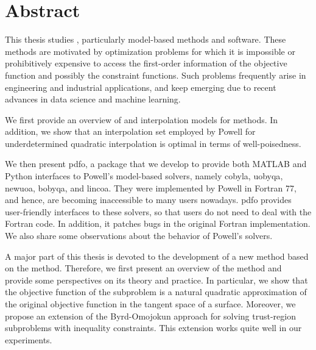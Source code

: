 %
%
%
\chapter*{Abstract}
\label{ch:abstract}

This thesis studies , particularly model-based methods and software.
These methods are motivated by optimization problems for which it is impossible or prohibitively expensive to access the first-order information of the objective function and possibly the constraint functions.
Such problems frequently arise in engineering and industrial applications, and keep emerging due to recent advances in data science and machine learning.

We first provide an overview of  and interpolation models for  methods.
In addition, we show that an interpolation set employed by Powell for underdetermined quadratic interpolation is optimal in terms of well-poisedness.

We then present \gls{pdfo}, a package that we develop to provide both MATLAB and Python interfaces to Powell's model-based  solvers, namely \gls{cobyla}, \gls{uobyqa}, \gls{newuoa}, \gls{bobyqa}, and \gls{lincoa}.
They were implemented by Powell in Fortran 77, and hence, are becoming inaccessible to many users nowadays.
\Gls{pdfo} provides user-friendly interfaces to these solvers, so that users do not need to deal with the Fortran code.
In addition, it patches bugs in the original Fortran implementation.
We also share some observations about the behavior of Powell's solvers.

A major part of this thesis is devoted to the development of a new  method based on the  method.
Therefore, we first present an overview of the  method and provide some perspectives on its theory and practice.
In particular, we show that the objective function of the  subproblem is a natural quadratic approximation of the original objective function in the tangent space of a surface.
Moreover, we propose an extension of the Byrd-Omojokun approach for solving trust-region  subproblems with inequality constraints.
This extension works quite well in our experiments.

